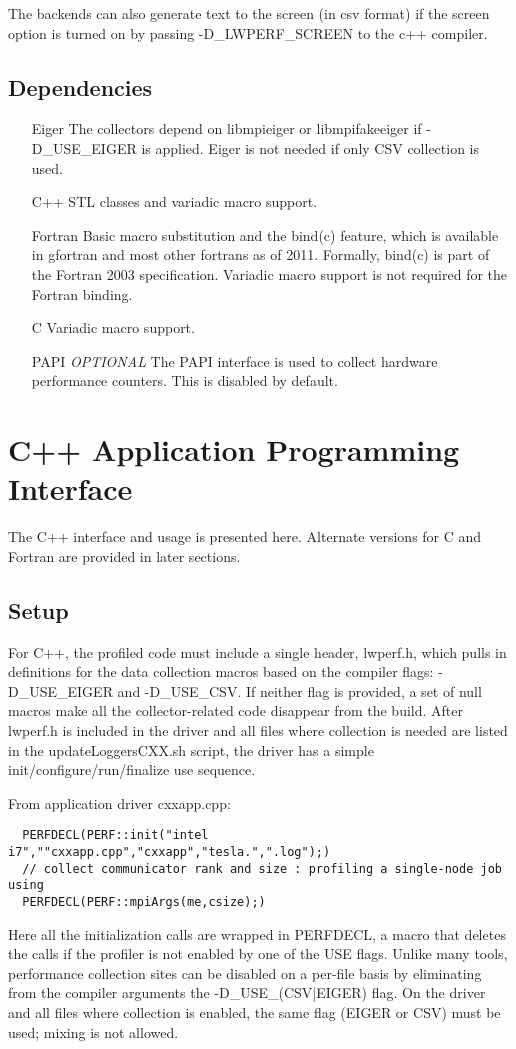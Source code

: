 \documentclass{article}
\begin{document}
The backends can also generate text to the screen (in csv format) if the screen option is turned on by passing -D\_LWPERF\_SCREEN to the c++ compiler.


\subsection{Dependencies}
\begin{itemize}
\item[Eiger] The collectors depend on libmpieiger or libmpifakeeiger if -D\_USE\_EIGER is applied. Eiger is not needed if only CSV collection is used.
\item[C++] STL classes and variadic macro support.
\item[Fortran] Basic macro substitution and the bind(c) feature, which is available in gfortran and most other fortrans as of 2011. Formally, bind(c) is part of the Fortran 2003 specification. Variadic macro support is not required for the Fortran binding.
\item[C] Variadic macro support.
\item[PAPI] \textit{OPTIONAL} The PAPI interface is used to collect hardware performance counters. This is disabled by default.
\end{itemize}

\section{C++ Application Programming Interface}
The C++ interface and usage is presented here. Alternate versions for C and Fortran are provided in later sections.
\label{sec:api}
\subsection{Setup}
For C++, the profiled code must include a single header, lwperf.h, which pulls in definitions for the data collection macros based on the compiler flags: -D\_USE\_EIGER and -D\_USE\_CSV. If neither flag is provided, a set of null macros make all the collector-related code disappear from the build.
After lwperf.h is included in the driver and all files where collection is needed are listed in the updateLoggersCXX.sh script, the driver has a simple init/configure/run/finalize use sequence. 

From application driver cxxapp.cpp:
\begin{verbatim}
  PERFDECL(PERF::init("intel i7",""cxxapp.cpp","cxxapp","tesla.",".log");)
  // collect communicator rank and size : profiling a single-node job using
  PERFDECL(PERF::mpiArgs(me,csize);)
\end{verbatim}
Here all the initialization calls are wrapped in PERFDECL, a macro that deletes the calls if the profiler is not enabled by one of the USE flags. Unlike many tools, performance collection sites can be disabled on a per-file basis by eliminating from the compiler arguments the -D\_USE\_(CSV|EIGER) flag. On the driver and all files where collection is enabled, the same flag (EIGER or CSV) must be used; mixing is not allowed. 
\end{document}
